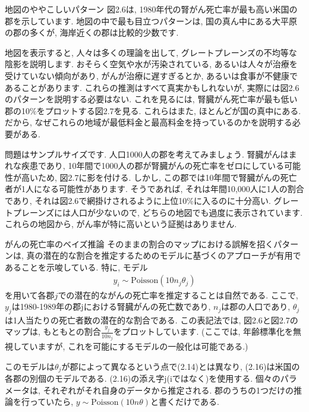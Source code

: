 \documentclass[10pt,dvipdfmx,a4]{beamer}
\newcommand{\eq}[1]{\begin{align}#1\end{align}}
\begin{document}

\begin{frame}{地図のややこしいパターン}
図2.6は, 1980年代の腎がん死亡率が最も高い米国の郡を示しています.
地図の中で最も目立つパターンは, 国の真ん中にある大平原の郡の多くが, 海岸近くの郡は比較的少数です.

地図を表示すると, 人々は多くの理論を出して, グレートプレーンズの不均等な陰影を説明します.
おそらく空気や水が汚染されている, あるいは人々が治療を受けていない傾向があり, がんが治療に遅すぎるとか, あるいは食事が不健康であることがあります.
これらの推測はすべて真実かもしれないが, 実際には図2.6のパターンを説明する必要はない.
これを見るには, 腎臓がん死亡率が最も低い郡の10\%をプロットする図2.7を見る.
これらはまた, ほとんどが国の真中にある.
だから, なぜこれらの地域が最低料金と最高料金を持っているのかを説明する必要がある.
\end{frame}


\begin{frame}
問題はサンプルサイズです.
人口1000人の郡を考えてみましょう.
腎臓がんはまれな疾患であり, 10年間で1000人の郡が腎臓がんの死亡率をゼロにしている可能性が高いため,  図2.7に影を付ける.
しかし, この郡では10年間で腎臓がんの死亡者が1人になる可能性があります.
そうであれば, それは年間10,000人に1人の割合であり, それは図2.6で網掛けされるように上位10\%に入るのに十分高い.
グレートプレーンズには人口が少ないので, どちらの地図でも過度に表示されています.
これらの地図から, がん率が特に高いという証拠はありません.
\end{frame}


\begin{frame}{がんの死亡率のベイズ推論}
そのままの割合のマップにおける誤解を招くパターンは, 真の潜在的な割合を推定するためのモデルに基づくのアプローチが有用であることを示唆している.
特に, モデル
\eq{y_i\sim\text{Poisson}(10n_j\theta_j)}
を用いて各郡$j$での潜在的ながんの死亡率を推定することは自然である.
ここで, $y_j$は1980-1989年の郡jにおける腎臓がんの死亡数であり, $n_j$は郡の人口であり, $\theta_j$は1人当たりの死亡者数の潜在的な割合である.
この表記法では, 図2.6と図2.7のマップは, もともとの割合$\frac{y_j}{10n_j}$をプロットしています.
(ここでは, 年齢標準化を無視していますが, これを可能にするモデルの一般化は可能である.)

このモデルは$\theta_j$が郡によって異なるという点で(2.14)とは異なり, (2.16)は米国の各郡の別個のモデルである.
(2.16)の添え字j(iではなく)を使用する.
個々のパラメータは, それぞれがそれ自身のデータから推定される.
郡のうちの1つだけの推論を行っていたら, $y\sim\text{Poisson}(10n\theta)$と書くだけである.
\end{frame}
\end{document}
